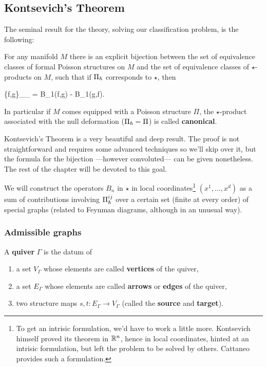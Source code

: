 \documentclass[main.tex]{subfiles}
\begin{document}
\subsection{Kontsevich's Theorem}
The seminal result for the theory, solving our classification problem, is the following:

\begin{theorem}
	For any manifold $M$ there is an explicit bijection between the set of equivalence classes of formal Poisson structures on $M$ and the set of equivalence classes of $\star$-products on $M$, such that if $\Pi_{\boldsymbol\hslash}$ corresponds to $\star$, then
	\begin{eqalign}
	\label{eq:corr_condition}
		\{f,g\}_{\Pi_\planck} = B_1(f,g) - B_1(g,f).
	\end{eqalign}
	In particular if $M$ comes equipped with a Poisson structure $\Pi$, the $\star$-product associated with the null deformation ($\Pi_{\boldsymbol\hslash} = \Pi$) is called \textbf{canonical}.
\end{theorem}

Kontsevich's Theorem is a very beautiful and deep result. The proof is not straightforward and requires some advanced techniques so we'll skip over it, but the formula for the bijection ---however convoluted--- can be given nonetheless. The rest of the chapter will be devoted to this goal.

We will construct the operators $B_n$ in $\star$ in local coordinates\footnote{To get an intrisic formulation, we'd have to work a little more. Kontsevich himself proved its theorem in $\mathbb{R}^n$, hence in local coordinates, hinted at an intrisic formulation, but left the problem to be solved by others. Cattaneo provides such a formulation.} $(x^1, \ldots, x^d)$ as a sum of contributions involving $\Pi^{ij}_{\boldsymbol\hslash}$ over a certain set (finite at every order) of special graphs (related to Feynman diagrams, although in an unusual way).

\subsubsection{Admissible graphs}
\begin{definition}
	A \textbf{quiver} $\Gamma$ is the datum of
	\begin{enumerate}
		\item a set $V_\Gamma$ whose elements are called \textbf{vertices} of the quiver,
		\item a set $E_\Gamma$ whose elements are called \textbf{arrows} or \textbf{edges} of the quiver,
		\item two structure maps $s,t : E_\Gamma \to V_\Gamma$ (called the \textbf{source} and \textbf{target}).
	\end{enumerate}
\end{definition}
\end{document}
